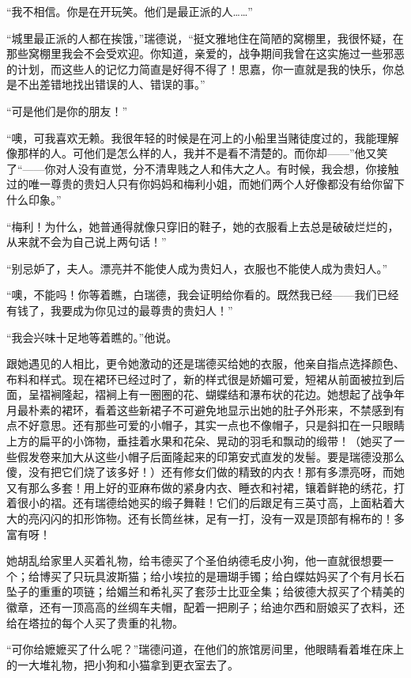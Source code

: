 \par “我不相信。你是在开玩笑。他们是最正派的人……”
\par “城里最正派的人都在挨饿，”瑞德说，“挺文雅地住在简陋的窝棚里，我很怀疑，在那些窝棚里我会不会受欢迎。你知道，亲爱的，战争期间我曾在这实施过一些邪恶的计划，而这些人的记忆力简直是好得不得了！思嘉，你一直就是我的快乐，你总是不出差错地找出错误的人、错误的事。”
\par “可是他们是你的朋友！”
\par “噢，可我喜欢无赖。我很年轻的时候是在河上的小船里当赌徒度过的，我能理解像那样的人。可他们是怎么样的人，我并不是看不清楚的。而你却——”他又笑了“——你对人没有直觉，分不清卑贱之人和伟大之人。有时候，我会想，你接触过的唯一尊贵的贵妇人只有你妈妈和梅利小姐，而她们两个人好像都没有给你留下什么印象。”
\par “梅利！为什么，她普通得就像只穿旧的鞋子，她的衣服看上去总是破破烂烂的，从来就不会为自己说上两句话！”
\par “别忌妒了，夫人。漂亮并不能使人成为贵妇人，衣服也不能使人成为贵妇人。”
\par “噢，不能吗！你等着瞧，白瑞德，我会证明给你看的。既然我已经——我们已经有钱了，我要成为你见过的最尊贵的贵妇人！”
\par “我会兴味十足地等着瞧的。”他说。
\par 跟她遇见的人相比，更令她激动的还是瑞德买给她的衣服，他亲自指点选择颜色、布料和样式。现在裙环已经过时了，新的样式很是娇媚可爱，短裙从前面被拉到后面，呈褶裥隆起，褶裥上有一圈圈的花、蝴蝶结和瀑布状的花边。她想起了战争年月最朴素的裙环，看着这些新裙子不可避免地显示出她的肚子外形来，不禁感到有点不好意思。还有那些可爱的小帽子，其实一点也不像帽子，只是斜扣在一只眼睛上方的扁平的小饰物，垂挂着水果和花朵、晃动的羽毛和飘动的缎带！（她买了一些假发卷来加大从这些小帽子后面隆起来的印第安式直发的发髻。要是瑞德没那么傻，没有把它们烧了该多好！）还有修女们做的精致的内衣！那有多漂亮呀，而她又有那么多套！用上好的亚麻布做的紧身内衣、睡衣和衬裙，镶着鲜艳的绣花，打着很小的褶。还有瑞德给她买的缎子舞鞋！它们的后跟足有三英寸高，上面粘着大大的亮闪闪的扣形饰物。还有长筒丝袜，足有一打，没有一双是顶部有棉布的！多富有呀！
\par 她胡乱给家里人买着礼物，给韦德买了个圣伯纳德毛皮小狗，他一直就很想要一个；给博买了只玩具波斯猫；给小埃拉的是珊瑚手镯；给白蝶姑妈买了个有月长石坠子的重重的项链；给媚兰和希礼买了套莎士比亚全集；给彼德大叔买了个精美的徽章，还有一顶高高的丝绸车夫帽，配着一把刷子；给迪尔西和厨娘买了衣料，还给在塔拉的每个人买了贵重的礼物。
\par “可你给嬷嬷买了什么呢？”瑞德问道，在他们的旅馆房间里，他眼睛看着堆在床上的一大堆礼物，把小狗和小猫拿到更衣室去了。
